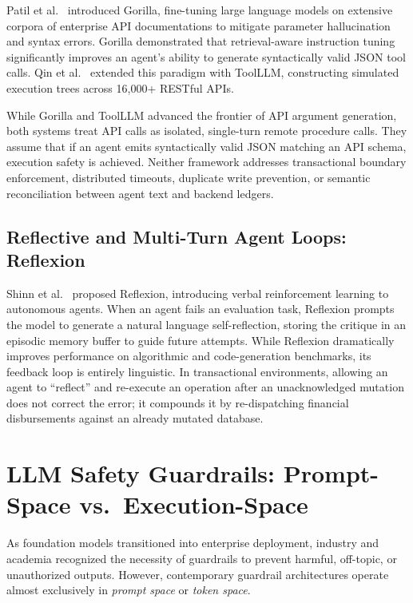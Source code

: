 Patil et al.\ \cite{patil2023gorilla} introduced Gorilla, fine-tuning large language models on extensive corpora of enterprise API documentations to mitigate parameter hallucination and syntax errors. Gorilla demonstrated that retrieval-aware instruction tuning significantly improves an agent's ability to generate syntactically valid JSON tool calls. Qin et al.\ \cite{qin2023toolllm} extended this paradigm with ToolLLM, constructing simulated execution trees across 16,000+ RESTful APIs. 

While Gorilla and ToolLLM advanced the frontier of API argument generation, both systems treat API calls as isolated, single-turn remote procedure calls. They assume that if an agent emits syntactically valid JSON matching an API schema, execution safety is achieved. Neither framework addresses transactional boundary enforcement, distributed timeouts, duplicate write prevention, or semantic reconciliation between agent text and backend ledgers.

\subsection{Reflective and Multi-Turn Agent Loops: Reflexion}

Shinn et al.\ \cite{shinn2023reflexion} proposed Reflexion, introducing verbal reinforcement learning to autonomous agents. When an agent fails an evaluation task, Reflexion prompts the model to generate a natural language self-reflection, storing the critique in an episodic memory buffer to guide future attempts. While Reflexion dramatically improves performance on algorithmic and code-generation benchmarks, its feedback loop is entirely linguistic. In transactional environments, allowing an agent to ``reflect'' and re-execute an operation after an unacknowledged mutation does not correct the error; it compounds it by re-dispatching financial disbursements against an already mutated database.

\section{LLM Safety Guardrails: Prompt-Space vs.\ Execution-Space}

As foundation models transitioned into enterprise deployment, industry and academia recognized the necessity of guardrails to prevent harmful, off-topic, or unauthorized outputs. However, contemporary guardrail architectures operate almost exclusively in \textit{prompt space} or \textit{token space}.

